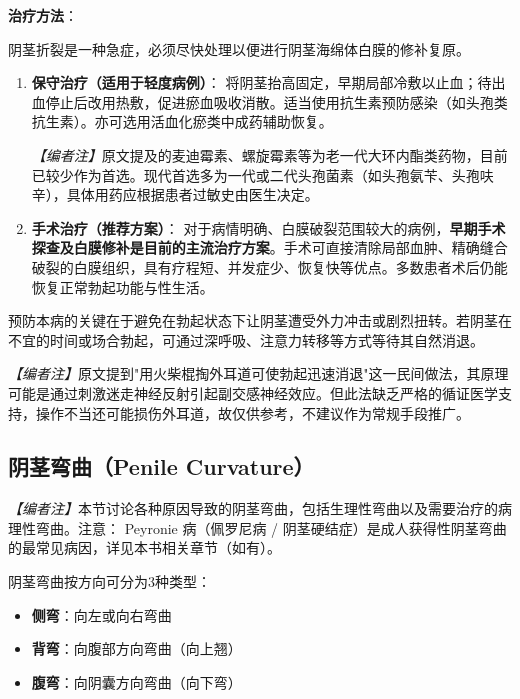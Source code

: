 \vspace{0.5em}
\noindent\textbf{治疗方法}：

阴茎折裂是一种急症，必须尽快处理以便进行阴茎海绵体白膜的修补复原。

\begin{enumerate}
	\item \textbf{保守治疗（适用于轻度病例）}：
	将阴茎抬高固定，早期局部冷敷以止血；待出血停止后改用热敷，促进瘀血吸收消散。适当使用抗生素预防感染（如头孢类抗生素）。亦可选用活血化瘀类中成药辅助恢复。

	\noindent\textit{【编者注】}原文提及的麦迪霉素、螺旋霉素等为老一代大环内酯类药物，目前已较少作为首选。现代首选多为一代或二代头孢菌素（如头孢氨苄、头孢呋辛），具体用药应根据患者过敏史由医生决定。

	\item \textbf{手术治疗（推荐方案）}：
	对于病情明确、白膜破裂范围较大的病例，\textbf{早期手术探查及白膜修补是目前的主流治疗方案}。手术可直接清除局部血肿、精确缝合破裂的白膜组织，具有疗程短、并发症少、恢复快等优点。多数患者术后仍能恢复正常勃起功能与性生活。
\end{enumerate}

\begin{tcolorbox}[colback=pink!5!white,colframe=red!50!black,title=贴心小叮咛]
预防本病的关键在于避免在勃起状态下让阴茎遭受外力冲击或剧烈扭转。若阴茎在不宜的时间或场合勃起，可通过深呼吸、注意力转移等方式等待其自然消退。

\noindent\textit{【编者注】}原文提到"用火柴棍掏外耳道可使勃起迅速消退"这一民间做法，其原理可能是通过刺激迷走神经反射引起副交感神经效应。但此法缺乏严格的循证医学支持，操作不当还可能损伤外耳道，故仅供参考，不建议作为常规手段推广。
\end{tcolorbox}

\subsection{阴茎弯曲（Penile Curvature）}
\label{subsec:penile_curvature}

\noindent\textit{【编者注】}本节讨论各种原因导致的阴茎弯曲，包括生理性弯曲以及需要治疗的病理性弯曲。注意： Peyronie 病（佩罗尼病 / 阴茎硬结症）是成人获得性阴茎弯曲的最常见病因，详见本书相关章节（如有）。

\vspace{0.5em}
阴茎弯曲按方向可分为3种类型：
\begin{itemize}
	\item \textbf{侧弯}：向左或向右弯曲
	\item \textbf{背弯}：向腹部方向弯曲（向上翘）
	\item \textbf{腹弯}：向阴囊方向弯曲（向下弯）
\end{itemize}

